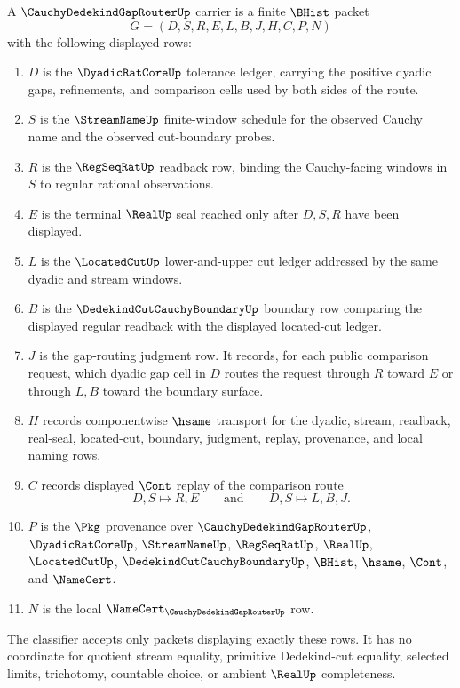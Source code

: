 \begin{definition}\label{def:cauchy-dedekind-gap-router-carrier}
A $\CauchyDedekindGapRouterUp$ carrier is a finite $\BHist$ packet
$$
G=(D,S,R,E,L,B,J,H,C,P,N)
$$
with the following displayed rows:
\begin{enumerate}
\item $D$ is the $\DyadicRatCoreUp$ tolerance ledger, carrying the positive dyadic gaps, refinements, and comparison cells used by both sides of the route.
\item $S$ is the $\StreamNameUp$ finite-window schedule for the observed Cauchy name and the observed cut-boundary probes.
\item $R$ is the $\RegSeqRatUp$ readback row, binding the Cauchy-facing windows in $S$ to regular rational observations.
\item $E$ is the terminal $\RealUp$ seal reached only after $D,S,R$ have been displayed.
\item $L$ is the $\LocatedCutUp$ lower-and-upper cut ledger addressed by the same dyadic and stream windows.
\item $B$ is the $\DedekindCutCauchyBoundaryUp$ boundary row comparing the displayed regular readback with the displayed located-cut ledger.
\item $J$ is the gap-routing judgment row. It records, for each public comparison request, which dyadic gap cell in $D$ routes the request through $R$ toward $E$ or through $L,B$ toward the boundary surface.
\item $H$ records componentwise $\hsame$ transport for the dyadic, stream, readback, real-seal, located-cut, boundary, judgment, replay, provenance, and local naming rows.
\item $C$ records displayed $\Cont$ replay of the comparison route
$$
D,S \longmapsto R,E \qquad\text{and}\qquad D,S \longmapsto L,B,J .
$$
\item $P$ is the $\Pkg$ provenance over $\CauchyDedekindGapRouterUp$, $\DyadicRatCoreUp$, $\StreamNameUp$, $\RegSeqRatUp$, $\RealUp$, $\LocatedCutUp$, $\DedekindCutCauchyBoundaryUp$, $\BHist$, $\hsame$, $\Cont$, and $\NameCert$.
\item $N$ is the local $\NameCert_{\CauchyDedekindGapRouterUp}$ row.
\end{enumerate}
The classifier accepts only packets displaying exactly these rows. It has no coordinate for quotient stream equality, primitive Dedekind-cut equality, selected limits, trichotomy, countable choice, or ambient $\RealUp$ completeness.
\end{definition}

